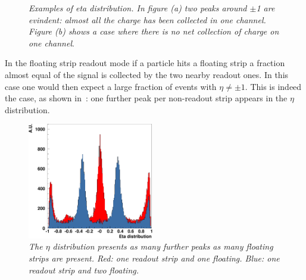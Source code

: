 \begin{figure}[!htbp]
  \centering 
  \caption{\textit{Examples of eta distribution. In figure (a) two peaks around $\pm$1 are evindent: almost all the charge has been collected in one channel. Figure (b) shows a case where there is no net collection of charge on one channel}.}
\label{fig:eta}
\end{figure}
In the floating strip readout mode if a particle hits a floating strip a
fraction almost equal of the signal is collected by the two nearby readout
ones. In this case one would then expect a large fraction of events with
$\eta\neq\pm 1$. This is indeed the case, as shown in~: 
one further peak per non-readout
strip appears in the $\eta$ distribution.\\
\begin{figure}[!htbp]
  \centering 
  \includegraphics[width=0.49\textwidth]{cap4/immagini/eta_floating.pdf}
  \caption{\textit{The $\eta$ distribution presents as many further
      peaks as many floating strips are present. Red: one readout
      strip and one floating. Blue: one readout strip and two
      floating.}}
  \label{fig:eta_floating}
\end{figure}
